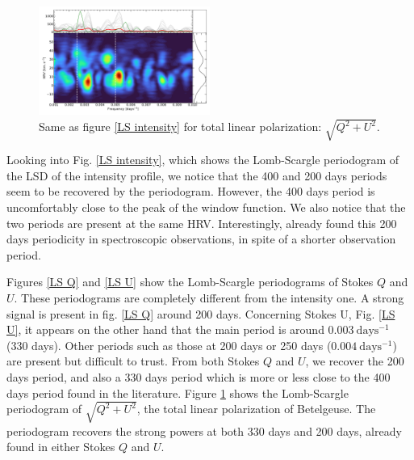 \documentclass{aa}
\begin{document}
\begin{figure}[!h]
    \centering
    \includegraphics[width=0.5\textwidth]{Lomb-Scargle linear polarization.pdf}
    \caption{Same as figure \ref{LS intensity} for total linear polarization: $\sqrt{Q^2+U^2}$.}
    \label{LS linear polarization}
\end{figure}




Looking into Fig. \ref{LS intensity}, which shows the Lomb-Scargle periodogram of the LSD of the intensity profile, 
we notice that the 400 and 200 days periods seem to be recovered by the periodogram. However, the 400 days period is uncomfortably close to 
the peak of the window function. We also notice that the two periods are present at the same HRV. Interestingly, 
\cite{mathias_evolution_2018} already found this 200 days periodicity in spectroscopic observations, in spite of a shorter observation period. 



Figures \ref{LS Q} and \ref{LS U} show the Lomb-Scargle periodograms of Stokes $Q$ and $U$. These periodograms are completely different 
from the intensity one. A strong signal is present in fig. \ref{LS Q} around 200 days. Concerning Stokes U, Fig. \ref{LS U}, it appears on the other hand that the main period is around $0.003 \ \mathrm{days^{-1}}$ (330 days). 
Other periods such as those at 200 days or 250 days ($0.004 \ \mathrm{days^{-1}}$) are present but difficult to trust. From both Stokes $Q$ and $U$, we recover the 200 days period, and also a 330 days period which  is more or less close to the 400 days period found in the literature. 
Figure \ref{LS linear polarization} shows the Lomb-Scargle periodogram of $\sqrt{Q^2+U^2}$, the total linear polarization of Betelgeuse. 
The periodogram recovers the strong powers at both 330 days and 200 days, already found in either Stokes $Q$ and $U$. 
\end{document}
